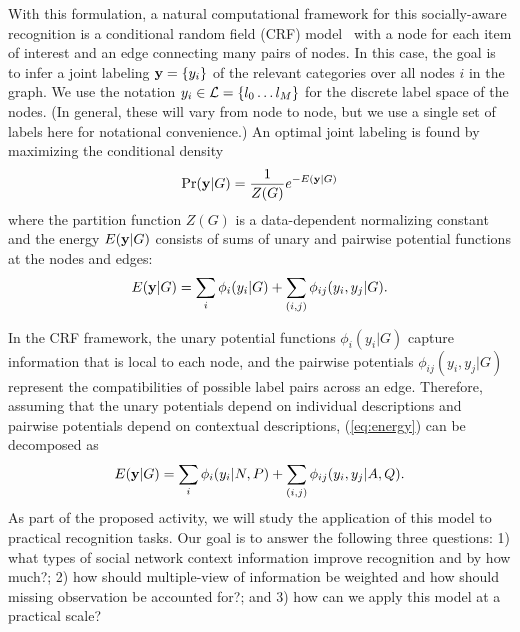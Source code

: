 With this formulation, a natural computational framework for this socially-aware recognition is a conditional random field (CRF) model~\cite{lafferty2001crf, sutton2007icr, he2004mcr} with a node for each item of interest and an edge connecting many pairs of nodes. In this case, the goal is to infer a joint labeling ${\bf y}=\{y_i\}$ of the relevant categories over all nodes $i$ in the graph. We use the notation $y_i\in{\cal L}=\{l_0\ldots l_M\}$ for the discrete label space of the nodes. (In general, these will vary from node to node, but we use a single set of labels here for notational convenience.) An optimal joint labeling is found by maximizing the conditional density
\begin{equation} \label{eq:crf}
{\rm Pr}({\bf y}|G) = \frac{1}{Z(G)}e^{-E({\bf y}|G)}
\end{equation}
where the partition function $Z(G)$ is a data-dependent normalizing constant and the energy $E({\bf y}|G)$ consists of sums of unary and pairwise potential functions at the nodes and edges:
\begin{equation}\label{eq:energy}
E({\bf y}|G) =  \sum_{i}  \phi_i (y_i|G) + \sum_{(i,j)} \phi_{ij}(y_i, y_j|G).
\end{equation}

In the CRF framework, the unary potential functions $\phi_i(y_i|G)$ capture information that is local to each node, and the pairwise potentials $\phi_{ij}(y_i, y_j|G)$ represent the compatibilities of possible label pairs across an edge. Therefore, assuming that the unary potentials depend on individual descriptions and pairwise potentials depend on contextual descriptions, (\ref{eq:energy}) can be decomposed as
\begin{equation}\label{eq:energy_simple}
E({\bf y}|G) =  \sum_{i}  \phi_i (y_i|N,P) + \sum_{(i,j)} \phi_{ij}(y_i, y_j|A,Q).
\end{equation}
As part of the proposed activity, we will study the application of this model to practical recognition tasks. Our goal is to answer the following three questions: 1) what types of social network context information improve recognition and by how much?; 2) how should multiple-view of information be weighted and how should missing observation be accounted for?; and 3) how can we apply this model at a practical scale? 


